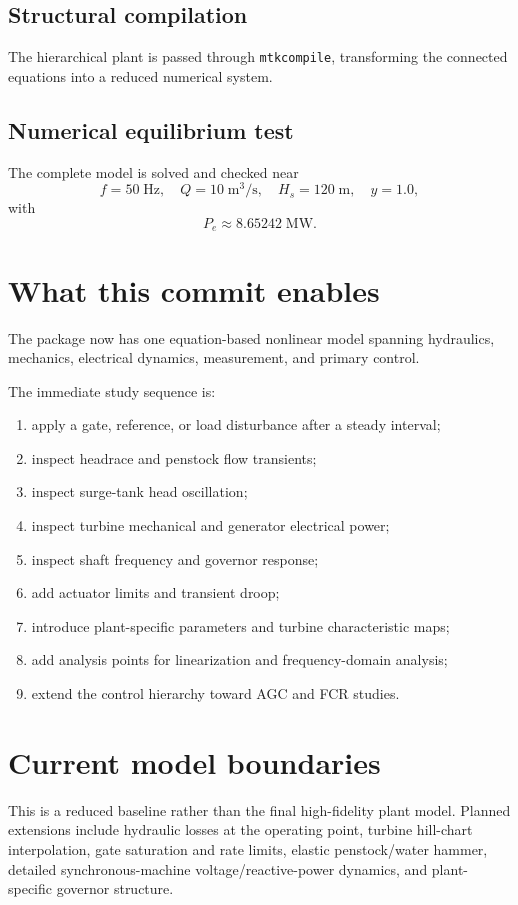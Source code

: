 \documentclass[11pt,a4paper]{article}
\begin{document}
\subsection*{Structural compilation}
The hierarchical plant is passed through \texttt{mtkcompile}, transforming the connected equations into a reduced numerical system.

\subsection*{Numerical equilibrium test}
The complete model is solved and checked near
\[
f=50\;\mathrm{Hz},
\quad
Q=10\;\mathrm{m^3/s},
\quad
H_s=120\;\mathrm{m},
\quad
y=1.0,
\]
with
\[
P_e\approx8.65242\;\mathrm{MW}.
\]

\section{What this commit enables}
The package now has one equation-based nonlinear model spanning hydraulics, mechanics, electrical dynamics, measurement, and primary control.

The immediate study sequence is:
\begin{enumerate}
\item apply a gate, reference, or load disturbance after a steady interval;
\item inspect headrace and penstock flow transients;
\item inspect surge-tank head oscillation;
\item inspect turbine mechanical and generator electrical power;
\item inspect shaft frequency and governor response;
\item add actuator limits and transient droop;
\item introduce plant-specific parameters and turbine characteristic maps;
\item add analysis points for linearization and frequency-domain analysis;
\item extend the control hierarchy toward AGC and FCR studies.
\end{enumerate}

\section{Current model boundaries}
This is a reduced baseline rather than the final high-fidelity plant model. Planned extensions include hydraulic losses at the operating point, turbine hill-chart interpolation, gate saturation and rate limits, elastic penstock/water hammer, detailed synchronous-machine voltage/reactive-power dynamics, and plant-specific governor structure.
\end{document}
